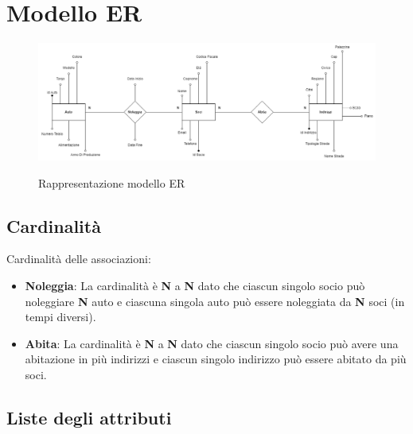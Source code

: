\documentclass[12pt]{article}
\begin{document}

\section{Modello ER}
\begin{figure}[h!]
    \centering
    \includegraphics[width=16cm]{modello_er_car_sharing.png}
    \label{fig:modello Er}
    \caption{Rappresentazione modello ER}
\end{figure}


\subsection{Cardinalità}

\noindent
Cardinalità delle associazioni:

\begin{itemize}
    \item \textbf{Noleggia}: La cardinalità è \textbf{N} a \textbf{N} dato che ciascun singolo socio può noleggiare \textbf{N} auto e ciascuna singola auto può essere noleggiata da \textbf{N} soci (in tempi diversi).

    \item \textbf{Abita}: La cardinalità è \textbf{N} a \textbf{N} dato che ciascun singolo socio può avere una abitazione in più indirizzi e ciascun singolo indirizzo  può essere abitato da più soci. 
\end{itemize}

\clearpage


\begin{center}
    \section{Liste degli attributi}
\end{center}
\end{document}
